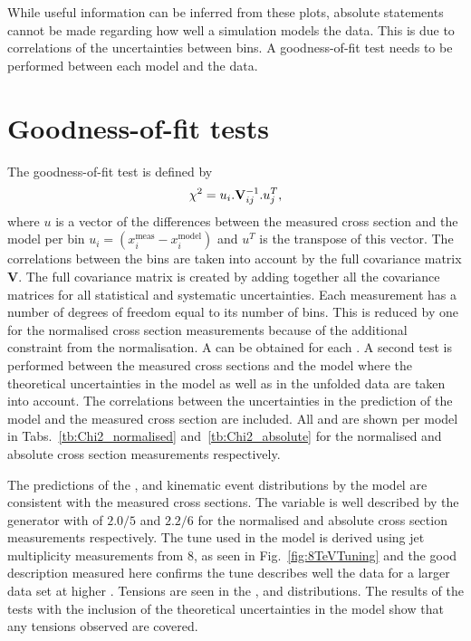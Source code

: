 While useful information can be inferred from these plots, absolute statements cannot be made regarding how well a simulation models the data.
This is due to correlations of the uncertainties between bins.
A \chisq{} goodness-of-fit test needs to be performed between each model and the data.


\section{Goodness-of-fit tests} %
\label{sec:the_goodness_of_fit_tests}

The \chisq{} goodness-of-fit test is defined by 
\begin{equation*}
	\chi^2 = u_{i} . \mathbf{V}^{-1}_{ij} . u^{T}_{j},
\end{equation*}
where $u$ is a vector of the differences between the measured cross section and the model per bin $u_{i}=(x_i^{\mathrm{meas}}-x_i^{\mathrm{model}})$ and $u^{T}$ is the transpose of this vector.
The correlations between the bins are taken into account by the full covariance matrix $\mathbf{V}$.
The full covariance matrix is created by adding together all the covariance matrices for all statistical and systematic uncertainties. 
Each measurement has a number of degrees of freedom equal to its number of bins.
This is reduced by one for the normalised cross section measurements because of the additional constraint from the normalisation.
A \pvalue{} can be obtained for each \chisndf{}.
A second \chisq{} test is performed between the measured cross sections and the \powhegpythia{} model where the theoretical uncertainties in the model as well as in the unfolded data are taken into account.
The correlations between the uncertainties in the prediction of the model and the measured cross section are included.
All \chisndf{} and \pvalues{} are shown per \ttbar{} model in Tabs.~\ref{tb:Chi2_normalised} and~\ref{tb:Chi2_absolute} for the normalised and absolute cross section measurements respectively.

The predictions of the \ST{}, \ptmiss{} and \LPT{} kinematic event distributions by the \powhegpythia{} model are consistent with the measured cross sections.
The \NJET{} variable is well described by the \powhegpythia{} generator with \chisndf{} of $2.0/5$ and $2.2/6$ for the normalised and absolute cross section measurements respectively.
The tune \CUET{} used in the \powhegpythia{} model is derived using jet multiplicity measurements from 8\TeV{}, as seen in Fig.~\ref{fig:8TeVTuning} and the good description measured here confirms the tune describes well the data for a larger data set at higher \sqrts{}.
Tensions are seen in the \ST{}, \WPT{} and \LETA{} distributions.
The results of the \chisq{} tests with the inclusion of the theoretical uncertainties in the \powhegpythia{} model show that any tensions observed are covered.

